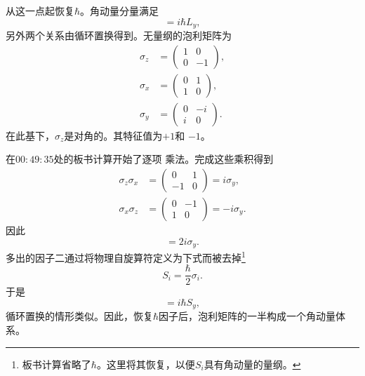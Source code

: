 从这一点起恢复\(\hbar\)。角动量分量满足
\begin{equation}
[L_{z},L_{x}]=i\hbar L_{y},
\end{equation}
另外两个关系由循环置换得到。无量纲的泡利矩阵为
\begin{equation}
\begin{aligned}
\sigma_{z}&=
\begin{pmatrix}
1&0\\
0&-1
\end{pmatrix},\\[0.4em]
\sigma_{x}&=
\begin{pmatrix}
0&1\\
1&0
\end{pmatrix},\\[0.4em]
\sigma_{y}&=
\begin{pmatrix}
0&-i\\
i&0
\end{pmatrix}.
\end{aligned}
\end{equation}
在此基下，\(\sigma_{z}\)是对角的。其特征值为\(+1\)和
\(-1\)。

\begin{classroomqa}
\end{classroomqa}

在\(00{:}49{:}35\)处的板书计算开始了逐项
乘法。完成这些乘积得到
\begin{align}
\sigma_{z}\sigma_{x}
&=
\begin{pmatrix}
0&1\\
-1&0
\end{pmatrix}
=i\sigma_{y},\\
\sigma_{x}\sigma_{z}
&=
\begin{pmatrix}
0&-1\\
1&0
\end{pmatrix}
=-i\sigma_{y}.
\end{align}
因此
\begin{equation}
[\sigma_{z},\sigma_{x}]=2i\sigma_{y}.
\end{equation}
多出的因子二通过将物理自旋算符定义为下式而被去掉\footnote{板书计算省略了\(\hbar\)。这里将其恢复，以便\(S_i\)具有角动量的量纲。}
\begin{equation}
S_{i}=\frac{\hbar}{2}\sigma_{i}.
\end{equation}
于是
\begin{equation}
[S_{z},S_{x}]=i\hbar S_{y},
\end{equation}
循环置换的情形类似。因此，恢复\(\hbar\)因子后，泡利矩阵的一半构成一个角动量体系。

